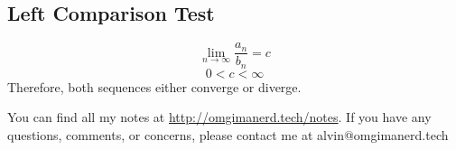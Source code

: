 \documentclass{math}
\begin{document}
\subsection*{Left Comparison Test}
\[ \lim_{n\to\infty}\frac{a_{n}}{b_{n}} = c \]
\[ 0 < c < \infty \]
Therefore, both sequences either converge or diverge.

\begin{center}
  You can find all my notes at \url{http://omgimanerd.tech/notes}. If you have
  any questions, comments, or concerns, please contact me at
  alvin@omgimanerd.tech
\end{center}
\end{document}
